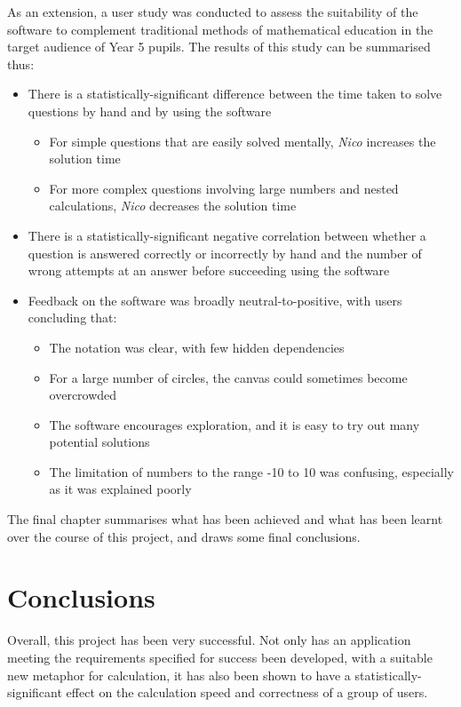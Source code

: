 \documentclass[12pt,twoside,notitlepage,xetex]{report}
\begin{document}
{As an extension, a user study was conducted to assess the suitability of the software to complement traditional methods of mathematical education in the target audience of Year 5 pupils.  The results of this study can be summarised thus:
\begin{itemize}
\item There is a statistically-significant difference between the time taken to solve questions by hand and by using the software
\begin{itemize}
\item For simple questions that are easily solved mentally, \emph{Nico} increases the solution time
\item For more complex questions involving large numbers and nested calculations, \emph{Nico} decreases the solution time
\end{itemize}
\item There is a statistically-significant negative correlation between whether a question is answered correctly or incorrectly by hand and the number of wrong attempts at an answer before succeeding using the software
\item Feedback on the software was broadly neutral-to-positive, with users concluding that:
\begin{itemize}
\item The notation was clear, with few hidden dependencies
\item For a large number of circles, the canvas could sometimes become overcrowded
\item The software encourages exploration, and it is easy to try out many potential solutions
\item The limitation of numbers to the range -10 to 10 was confusing, especially as it was explained poorly
\end{itemize}
\end{itemize}

The final chapter summarises what has been achieved and what has been learnt over the course of this project, and draws some final conclusions.


\cleardoublepage
\chapter{Conclusions}

Overall, this project has been very successful.  Not only has an application meeting the requirements specified for success been developed, with a suitable new metaphor for calculation, it has also been shown to have a statistically-significant effect on the calculation speed and correctness of a group of users.

}
\end{document}

